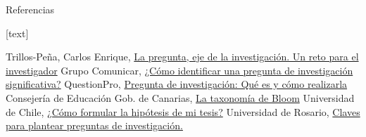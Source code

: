 \documentclass[
	11pt, %
]{beamer}
\begin{document}
\begin{frame}{Referencias}
  \begin{thebibliography}{10}
    [text]

    Trillos-Peña, Carlos Enrique, \href{http://www.scielo.org.co/scielo.php?script=sci_arttext&pid=S1692-72732017000300309}{La pregunta, eje de la investigación. Un reto para el investigador}
    Grupo Comunicar, \href{https://www.grupocomunicar.com/wp/escuela-de-autores/como-identificar-una-pregunta-de-investigacion-significativa/}{¿Cómo identificar una pregunta de investigación significativa?}
    QuestionPro, \href{https://www.questionpro.com/blog/es/pregunta-de-investigacion/}{Pregunta de investigación: Qué es y cómo realizarla}
    Consejería de Educación Gob. de Canarias, \href{https://www3.gobiernodecanarias.org/medusa/edublog/cprofestenerifesur/2015/12/03/la-taxonomia-de-bloom-una-herramienta-imprescindible-para-ensenar-y-aprender/}{La taxonomía de Bloom}
    Universidad de Chile, \href{https://aprendizaje.uchile.cl/recursos-para-leer-escribir-y-hablar-en-la-universidad/profundiza/profundiza-en-la-tesis/hipotesis/}{¿Cómo formular la hipótesis de mi tesis?}
    Universidad de Rosario, \href{https://urosario.edu.co/sites/default/files/2022-07/Claves-para-plantear-preguntas-de-investigacion.pdf}{Claves para plantear preguntas de investigación.}
    
    

  \end{thebibliography}
\end{frame}
\end{document}
